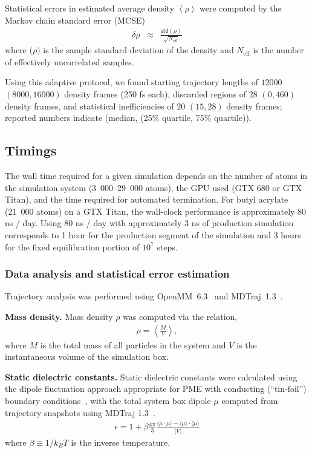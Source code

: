 \documentclass[aip, jcp, reprint]{revtex4-1}  %
\begin{document}
Statistical errors in estimated average density $\left< \rho \right>$ were computed by the Markov chain standard error (MCSE)
\begin{eqnarray}
\delta \rho &\approx& \frac{\mathsf{std}(\rho)}{\sqrt{N_\mathrm{eff}}} \label{equation:density-standard-error}
\end{eqnarray}
where $\mathsf(\rho)$ is the sample standard deviation of the density and $N_\mathrm{eff}$ is the number of effectively uncorrelated samples.  

Using this adaptive protocol, we found starting trajectory lengths of $12000$ $(8000, 16000)$ density frames (250 fs each), discarded regions of $28$  $(0, 460)$ density frames, and statistical inefficiencies of $20$ $(15, 28)$ density frames; reported numbers indicate (median, (25\% quartile, 75\% quartile)).  

\subsection{Timings}

The wall time required for a given simulation depends on the number of atoms in the simulation system (3~000--29~000 atoms), the GPU used (GTX 680 or GTX Titan), and the time required for automated termination.  
For butyl acrylate (21~000 atoms) on a GTX Titan, the wall-clock performance is approximately 80 ns / day.  Using 80 ns / day with approximately 3 ns of production simulation corresponds to 1 hour for the production segment of the simulation and 3 hours for the fixed equilibration portion of $10^7$ steps.  

\subsubsection{Data analysis and statistical error estimation}

Trajectory analysis was performed using OpenMM~6.3~\cite{eastman2012openmm} and MDTraj~1.3~\cite{mcgibbon2014mdtraj}.  

{\bf Mass density.}
Mass density $\rho$ was computed via the relation,
\begin{eqnarray}
\rho = \left\langle \frac{M}{V} \right\rangle \label{equation:mass-density} ,
 \end{eqnarray}
where $M$ is the total mass of all particles in the system and $V$ is the instantaneous volume of the simulation box.

{\bf Static dielectric constants.}
Static dielectric constants were calculated using the dipole fluctuation approach appropriate for PME with conducting (``tin-foil'') boundary conditions~\cite{horn2004, neumann1983dipole}, with the total system box dipole $\mu$ computed from trajectory snapshots using MDTraj 1.3~\cite{mcgibbon2014mdtraj}.
\begin{eqnarray}
\epsilon = 1 + \beta \frac{4\pi}{3} \frac{\langle \mu \cdot \mu \rangle - \langle \mu \rangle \cdot \langle \mu \rangle}{\langle V \rangle} \label{equation:dielectric_calculation}
\end{eqnarray}
where $\beta \equiv 1 / k_B T$ is the inverse temperature.
\end{document}
